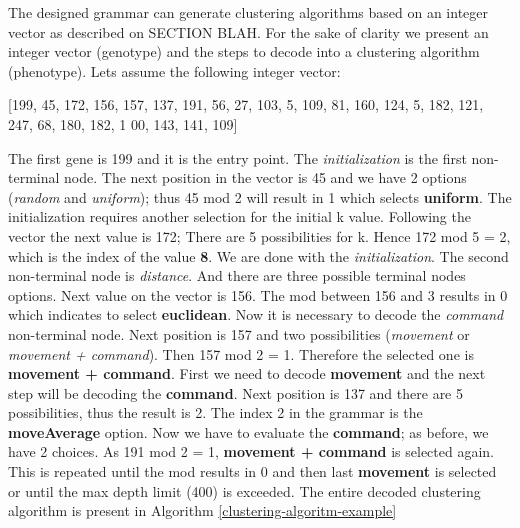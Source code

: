 \documentclass[journal]{IEEEtran}
\begin{document}
The designed grammar can generate clustering algorithms based on an integer vector as described on SECTION BLAH. 
For the sake of clarity we present an integer vector (genotype) and the steps to decode into a clustering algorithm (phenotype). 
Lets assume the following integer vector:

[199, 45, 172, 156, 157, 137, 191, 56, 27, 103, 5, 109, 81, 160, 124, 5, 182, 121, 247, 68, 180, 182, 1
00, 143, 141, 109]

The first gene is 199 and it is the entry point. The \textit{initialization}  is the first non-terminal node. The next position in the vector is 45 
and we have 2 options  (\textit{random} and \textit{uniform}); thus 45 mod 2 will result in 1 which selects \textbf{uniform}. The initialization requires another selection for the initial k value. Following the vector the next value  is 172; There are 5 possibilities for k. Hence 172 mod 5 = 2, which is the index of the value \textbf{8}.
We are done with the \textit{initialization}. The second non-terminal node is \textit{distance}. And there are three possible terminal nodes options. Next value on the vector is 156. The mod between 
156 and 3 results in 0 which indicates to select \textbf{euclidean}. 
Now it is necessary to decode the \textit{command} non-terminal node. Next position is 157 and two possibilities (\textit{movement} or \textit{movement + command}). Then 157 mod 2 = 1. 
Therefore the selected one is \textbf{movement + command}. First we need to decode \textbf{movement} and the next step will be decoding the \textbf{command}. Next position is 137 and there are 5 possibilities, thus the result is 2. 
The index 2 in the grammar is the \textbf{moveAverage} option. Now we have to evaluate the \textbf{command}; as before, we have 2 choices. As 191 mod 2 = 1, \textbf{movement + command} is selected again. This is repeated until the mod results in 0 and then last \textbf{movement} is selected or until the max depth limit (400) is exceeded. The entire decoded clustering algorithm is present in Algorithm \ref{clustering-algoritm-example}
\end{document}
